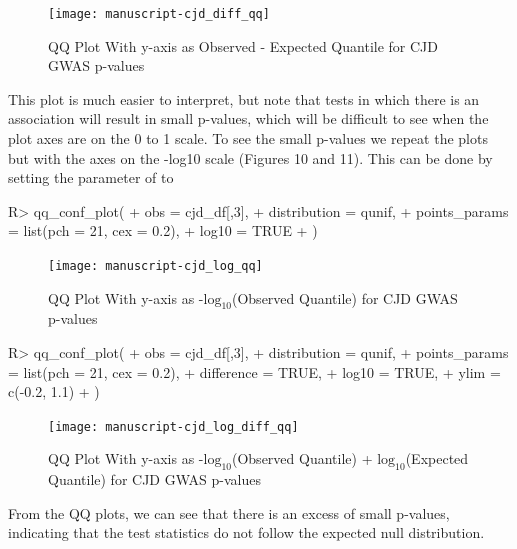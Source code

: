 \documentclass[article]{jss}
\begin{document}
\begin{figure}
\begin{center}
\texttt{[image: manuscript-cjd\_diff\_qq]}
\end{center}
\caption{QQ Plot With y-axis as Observed - Expected Quantile for CJD GWAS p-values}
\end{figure}

This plot is much easier to interpret, but note that tests in which there is an association will result in small p-values, which will be difficult to see when the plot axes are on the 0 to 1 scale. To see the small p-values we repeat the plots but with the axes on the -log10 scale (Figures 10 and 11). This can be done by setting the  parameter of  to 

\begin{Schunk}
\begin{Sinput}
R> qq_conf_plot(
+    obs = cjd_df[,3],
+    distribution = qunif,
+    points_params = list(pch = 21, cex = 0.2),
+    log10 = TRUE
+    )
\end{Sinput}
\end{Schunk}

\begin{figure}
\begin{center}
\texttt{[image: manuscript-cjd\_log\_qq]}
\end{center}
\caption{QQ Plot With y-axis as -$\textrm{log}_{10}$(Observed Quantile) for CJD GWAS p-values}
\end{figure}

\begin{Schunk}
\begin{Sinput}
R> qq_conf_plot(
+    obs = cjd_df[,3],
+    distribution = qunif,
+    points_params = list(pch = 21, cex = 0.2),
+    difference = TRUE,
+    log10 = TRUE,
+    ylim = c(-0.2, 1.1)
+    )
\end{Sinput}
\end{Schunk}

\begin{figure}
\begin{center}
\texttt{[image: manuscript-cjd\_log\_diff\_qq]}
\end{center}
\caption{QQ Plot With y-axis as -$\textrm{log}_{10}$(Observed Quantile) + $\textrm{log}_{10}$(Expected Quantile) for CJD GWAS p-values}
\end{figure}

From the QQ plots, we can see that there is an excess of small p-values, indicating that the test statistics do not follow the expected null distribution.
\end{document}
